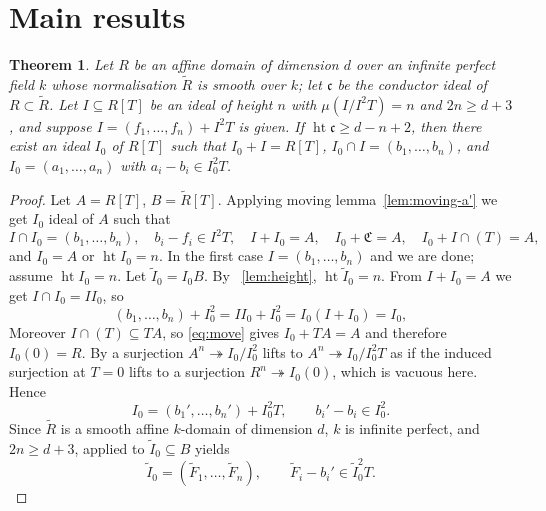 \documentclass[11pt,reqno]{amsart}
\theoremstyle{plain}
\newtheorem{theorem}{Theorem}[section]
\theoremstyle{definition}
\newcommand{\hgt}{\operatorname{ht}}
\newcommand{\Rt}{\widetilde{R}}
\newcommand{\It}{\widetilde{I}}
\newcommand{\cc}{\mathfrak{c}}
\newcommand{\CC}{\mathfrak{C}}
\begin{document}
\section{Main results}
\begin{theorem}\label{thm:main}
Let $R$ be an affine domain of dimension $d$ over an infinite perfect field $k$ whose
normalisation $\Rt$ is smooth over $k$; let $\cc$ be the conductor ideal of $R\subset \Rt$. Let $I\subseteq R[T]$ be an ideal
of height $n$ with $\mu(I/I^2T)=n$ and $2n\ge d+3$, and suppose $I=(f_1,\dots,f_n)+I^2T$ is
given. If $\hgt\cc\ge d-n+2$, then there exist an ideal $I_0$ of $R[T]$ such that $I_0+I=R[T]$, $I_0\cap I=(b_1,\ldots,b_n)$, and $I_0=(a_1,\ldots,a_n)$ with $a_i-b_i\in I_0^2T$.

\end{theorem}
\begin{proof}
    Let $A=R[T]$, $B=\Rt[T]$. 
Applying moving lemma~\ref{lem:moving-a'} we get $I_0$ ideal of $A$ such that
\begin{equation}\label{eq:move}
I\cap I_0=(b_1,\dots,b_n),\quad b_i-f_i\in I^2T,\quad I+I_0=A,\quad I_0+\CC=A,\quad
I_0+I\cap(T)=A,
\end{equation}
and $I_0=A$ or $\hgt I_0=n$. In the first case $I=(b_1,\dots,b_n)$ and we are done; assume
$\hgt I_0=n$. Let $\It_0=I_0B$. By ~\ref{lem:height},
$\hgt\It_0=n$. 
From $I+I_0=A$ we get $I\cap I_0=II_0$, so
\[
(b_1,\dots,b_n)+I_0^2=II_0+I_0^2=I_0(I+I_0)=I_0,
\] 
 Moreover $I\cap (T)\subseteq TA$, so \eqref{eq:move} gives $I_0+TA=A$
and therefore $I_0(0)=R$. By \cite[Remark 3.9]{BS98} a surjection $A^n\twoheadrightarrow
I_0/I_0^2$ lifts to $A^n\twoheadrightarrow I_0/I_0^2T$ as if the induced surjection at
$T=0$ lifts to a surjection $R^n\twoheadrightarrow I_0(0)$, which is vacuous here. 
Hence
\begin{equation}\label{eq:Tpres}
I_0=(b_1',\dots,b_n')+I_0^2T,\qquad b_i'-b_i\in I_0^2 .
\end{equation}
Since $\Rt$ is a smooth affine $k$-domain
of dimension $d$, $k$ is infinite perfect, and $2n\ge d+3$, \cite[Theorem 4.13]{BK03} applied
to $\It_0\subseteq B$ yields
\begin{equation}\label{eq:up}
\It_0=(\widetilde F_1,\dots,\widetilde F_n),\qquad \widetilde F_i-b_i'\in\It_0^2T .
\end{equation}





\end{proof}
\end{document}
